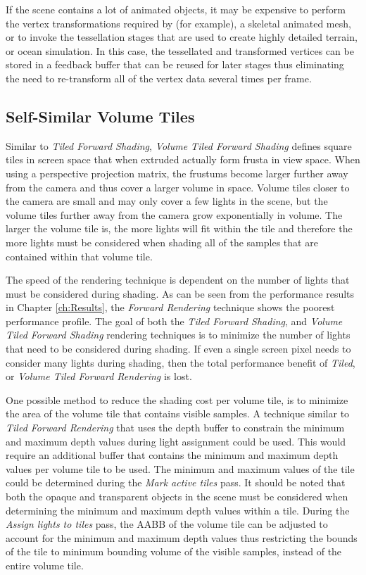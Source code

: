 If the scene contains a lot of animated objects, it may be expensive to perform the vertex transformations required by (for example), a skeletal animated mesh, or to invoke the tessellation stages that are used to create highly detailed terrain, or ocean simulation. In this case, the tessellated and transformed vertices can be stored in a feedback buffer that can be reused for later stages thus eliminating the need to re-transform all of the vertex data several times per frame.

\subsection{Self-Similar Volume Tiles}

Similar to \emph{Tiled Forward Shading}, \emph{Volume Tiled Forward Shading} defines square tiles in screen space that when extruded actually form frusta in view space. When using a perspective projection matrix, the frustums become larger further away from the camera and thus cover a larger volume in space. Volume tiles closer to the camera are small and may only cover a few lights in the scene, but the volume tiles further away from the camera grow exponentially in volume. The larger the volume tile is, the more lights will fit within the tile and therefore the more lights must be considered when shading all of the samples that are contained within that volume tile.


The speed of the rendering technique is dependent on the number of lights that must be considered during shading. As can be seen from the performance results in Chapter \ref{ch:Results}, the \emph{Forward Rendering} technique shows the poorest performance profile. The goal of both the \emph{Tiled Forward Shading}, and \emph{Volume Tiled Forward Shading} rendering techniques is to minimize the number of lights that need to be considered during shading.  If even a single screen pixel needs to consider many lights during shading, then the total performance benefit of \emph{Tiled}, or \emph{Volume Tiled Forward Rendering} is lost.

One possible method to reduce the shading cost per volume tile, is to minimize the area of the volume tile that contains visible samples. A technique similar to \emph{Tiled Forward Rendering} that uses the depth buffer to constrain the minimum and maximum depth values during light assignment could be used. This would require an additional buffer that contains the minimum and maximum depth values per volume tile to be used. The minimum and maximum values of the tile could be determined during the \emph{Mark active tiles} pass. It should be noted that both the opaque and transparent objects in the scene must be considered when determining the minimum and maximum depth values within a tile. During the \emph{Assign lights to tiles} pass, the AABB of the volume tile can be adjusted to account for the minimum and maximum depth values thus restricting the bounds of the tile to minimum bounding volume of the visible samples, instead of the entire volume tile.

